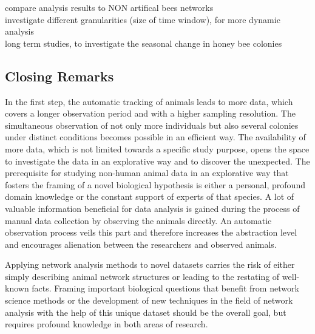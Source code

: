 compare analysis results to NON artifical bees networks\\

investigate different granularities (size of time window), for more dynamic analysis\\

long term studies, to investigate the seasonal change in honey bee colonies\\


\subsection{Closing Remarks}
In the first step, the automatic tracking of animals leads to more data, which covers a longer observation period and with a higher sampling resolution. The simultaneous observation of not only more individuals but also several colonies under distinct conditions becomes possible in an efficient way.
The availability of more data, which is not limited towards a specific study purpose, opens the space to investigate the data in an explorative way and to discover the unexpected.
The prerequisite for studying non-human animal data in an explorative way that fosters the framing of a novel biological hypothesis is either a personal, profound domain knowledge or the constant support of experts of that species.
A lot of valuable information beneficial for data analysis is gained during the process of manual data collection by observing the animals directly. An automatic observation process veils this part and therefore increases the abstraction level and encourages alienation between the researchers and observed animals.

Applying network analysis methods to novel datasets carries the risk of either simply describing animal network structures or leading to the restating of well-known facts. Framing important biological questions that benefit from network science methods or the development of new techniques in the field of network analysis with the help of this unique dataset should be the overall goal, but requires profound knowledge in both areas of research.